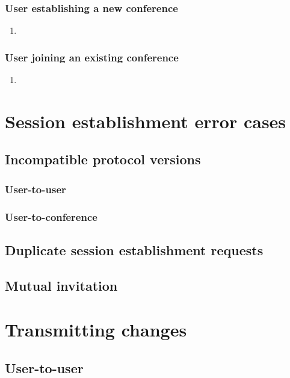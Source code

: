 \documentclass[11pt]{article}
\begin{document}
\subsubsection{User establishing a new conference}
\begin{enumerate}
\item 
\end{enumerate}

\subsubsection{User joining an existing conference}
\label{joining-existing-conference}
\begin{enumerate}
\item 
\end{enumerate}

\section{Session establishment error cases}
\subsection{Incompatible protocol versions}

\subsubsection{User-to-user}

\subsubsection{User-to-conference}

\subsection{Duplicate session establishment requests}

\subsection{Mutual invitation}

\section{Transmitting changes}
\subsection{User-to-user}
\end{document}
